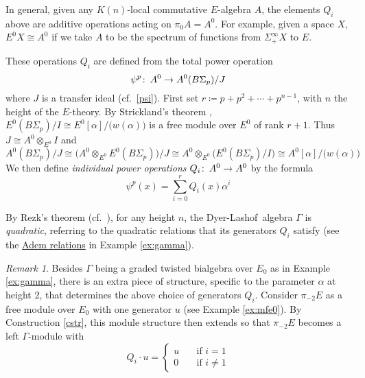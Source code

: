 \documentclass{gtpart}
\theoremstyle{definition}
\theoremstyle{remark}
\newtheorem{rmk}[thm]{Remark}
\def\co{\colon\thinspace}
\newcommand{\DL}{Dyer-Lashof~}
\newcommand{\A}{\alpha}
\newcommand{\G}{\Gamma}
\newcommand{\ce}{\coloneqq}
\renewcommand{\=}{\approx}
\renewcommand{\-}{\sim}
\numberwithin{equation}{section}
\numberwithin{thm}{section}
\begin{document}
In general, given any $K(n)$-local commutative $E$-algebra $A$, 
the elements $Q_i$ above are additive operations acting on $\pi_0 A = A^0$.  
For example, given a space $X$, $E^0 X \cong A^0$ 
if we take $A$ to be the spectrum of functions from $\Sigma_+^\infty X$ to $E$.  

These operations $Q_i$ are defined from the total power operation 
\begin{equation}
 \label{totalpo}
 \psi^p \co A^0 \to A^0(B\Sigma_p) / J 
\end{equation}
where $J$ is a transfer ideal (cf.~\eqref{psi}).  
First set $r \ce p + p^2 + \cdots + p^{n - 1}$, with $n$ the height of the $E$-theory.  
By Strickland's theorem \cite[Theorem 1.1]{Str98}, 
$E^0(B\Sigma_p) / I \cong E^0[\A] / \big( w(\A) \big)$ is a free module over $E^0$ of rank $r + 1$.  
Thus $J \cong A^0 \otimes_{E^0} I$ and 
\begin{equation}
 \label{totalpocont}
 A^0(B\Sigma_p) / J \cong \big( A^0 \otimes_{E^0} E^0(B\Sigma_p) \big) / J \cong A^0 \otimes_{E^0} \big( E^0(B\Sigma_p) / I \big) \cong A^0[\A] / \big( w(\A) \big) 
\end{equation}
We then define {\em individual power operations} $Q_i \co A^0 \to A^0$ by the formula 
\begin{equation}
 \label{Q}
 \psi^p(x) = \sum_{i=0}^r Q_i(x) \A^i 
\end{equation}

By Rezk's theorem \cite[Main Theorem and Proposition 4.10]{koszul} (cf.~\cite[1.10]{mc1}), 
for any height $n$, the \DL algebra $\G$ is {\em quadratic}, 
referring to the quadratic relations that its generators $Q_i$ satisfy 
(see the \hyperref[Adem]{Adem relations} in Example \ref{ex:gamma}).  

\begin{rmk}
 Besides $\G$ being a graded twisted bialgebra over $E_0$ as in Example \ref{ex:gamma}, 
 there is an extra piece of structure, specific to the parameter $\A$ at height 2, that determines the above choice of generators $Q_i$.  
 Consider $\pi_{-2} E$ as a free module over $E_0$ with one generator $u$ (see Example \ref{ex:mfe0}).  
 By Construction \ref{cstr}, this module structure then extends so that $\pi_{-2} E$ becomes a left $\G$-module with 
 \[
  Q_i \cdot u = \left\{\!\!
  \begin{array}{ll}
   u & \quad \text{if $i = 1$} \\
   0 & \quad \text{if $i \neq 1$} 
  \end{array}
  \right.
 \]
\end{rmk}
\end{document}
